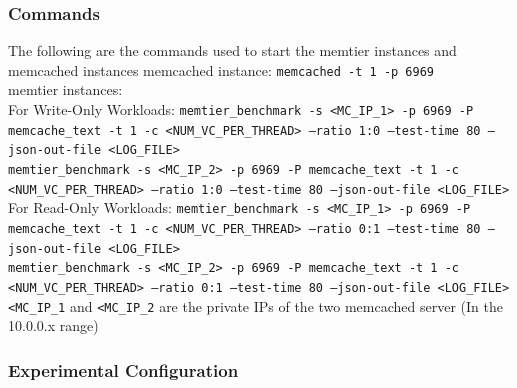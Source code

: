 \documentclass[11pt,a4paper]{article}
\newcommand\instructions[1]{\textcolor{blue}{Instructions: #1}}
\begin{document}

\subsubsection{Commands}
The following are the commands used to start the memtier instances and memcached instances
{\scriptsize memcached instance: \texttt{memcached -t 1 -p 6969} \\
memtier instances:\\
For Write-Only Workloads: \texttt{memtier\_benchmark -s <MC\_IP\_1> -p 6969 -P memcache\_text -t 1 -c <NUM\_VC\_PER\_THREAD> --ratio 1:0 --test-time 80 --json-out-file <LOG\_FILE> \\}
						  \texttt{memtier\_benchmark -s <MC\_IP\_2> -p 6969 -P memcache\_text -t 1 -c <NUM\_VC\_PER\_THREAD> --ratio 1:0 --test-time 80 --json-out-file <LOG\_FILE> } \\
For Read-Only Workloads:  \texttt{memtier\_benchmark -s <MC\_IP\_1> -p 6969 -P memcache\_text -t 1 -c <NUM\_VC\_PER\_THREAD> --ratio 0:1 --test-time 80 --json-out-file <LOG\_FILE> } \\
						  \texttt{memtier\_benchmark -s <MC\_IP\_2> -p 6969 -P memcache\_text -t 1 -c <NUM\_VC\_PER\_THREAD> --ratio 0:1 --test-time 80 --json-out-file <LOG\_FILE> } \\}
\texttt{<MC\_IP\_1} and \texttt{<MC\_IP\_2} are the private IPs of the two memcached server (In the 10.0.0.x range)
\subsubsection{Experimental Configuration}
\end{document}
